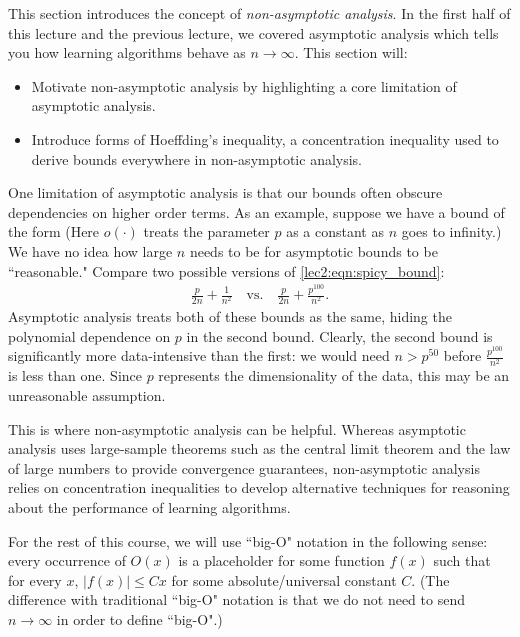 

This section introduces the concept of \textit{non-asymptotic analysis}. In the first half of this lecture and the previous lecture, we covered asymptotic analysis which tells you how learning algorithms behave as $n \to \infty$. This section will:
\begin{itemize}
    \item Motivate non-asymptotic analysis by highlighting a core limitation of asymptotic analysis.
    \item Introduce forms of Hoeffding's inequality, a concentration inequality used to derive bounds everywhere in non-asymptotic analysis.
\end{itemize}

One limitation of asymptotic analysis is that our bounds often obscure dependencies on higher order terms. As an example, suppose we have a bound of the form
(Here $o(\cdot)$ treats the parameter $p$ as a constant as $n$ goes to infinity.) 
We have no idea how large $n$ needs to be for asymptotic bounds to be ``reasonable." Compare two possible versions of \eqref{lec2:eqn:spicy_bound}: 
\begin{align}
    \frac{p}{2n} + \frac{1}{n^2} \quad \text{vs.} \quad \frac{p}{2n} + \frac{p^{100}}{n^2}.
\end{align}
Asymptotic analysis treats both of these bounds as the same, hiding the polynomial dependence on $p$ in the second bound. Clearly, the second bound is significantly more data-intensive than the first: we would need $n > p^{50}$ before $\frac{p^{100}}{n^2}$ is less than one. Since $p$ represents the dimensionality of the data, this may be an unreasonable assumption.

This is where non-asymptotic analysis can be helpful. Whereas asymptotic analysis uses large-sample theorems such as the central limit theorem and the law of large numbers to provide convergence guarantees, non-asymptotic analysis relies on concentration inequalities to develop alternative techniques for reasoning about the performance of learning algorithms.


For the rest of this course, we will use ``big-O" notation in the following sense: every occurrence of $O(x)$ is a placeholder for some function $f(x)$ such that for every $x$, $|f(x)| \leq Cx$ for some absolute/universal constant $C$. (The difference with traditional ``big-O" notation is that we do not need to send $n \to \infty$ in order to define ``big-O".)

